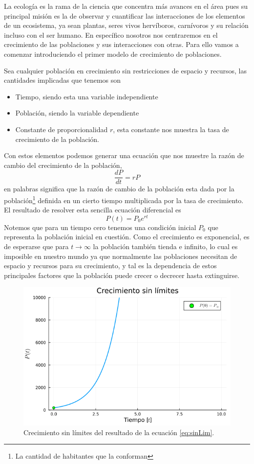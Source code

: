 \documentclass[11pt,a4paper]{article}
\begin{document}
La ecología es la rama de la ciencia que concentra más avances en el área pues su principal misión es la de observar y cuantificar las interacciones de los elementos de un ecosistema, ya sean plantas, seres vivos hervíboros, carnívoros y su relación incluso con el ser humano. En específico nosotros nos centraremos en el crecimiento de las poblaciones y sus interacciones con otras. Para ello vamos a comenzar  introduciendo el primer modelo de crecimiento de poblaciones.

Sea cualquier población en crecimiento sin restricciones de espacio y recursos, las cantidades implicadas que tenemos son
\begin{itemize}
\item Tiempo, siendo esta una variable independiente
\item Población, siendo la variable dependiente
\item Constante de proporcionalidad $r$, esta constante nos muestra la tasa de crecimiento de la población.
\end{itemize}
Con estos elementos podemos generar una ecuación que nos muestre la razón de cambio del crecimiento de la población,
\begin{equation}\label{eq:sinLim}
\frac{dP}{dt}=rP
\end{equation}
en palabras significa que la razón de cambio de la población esta dada por la población\footnote{La cantidad de habitantes que la conforman} definida en un cierto tiempo multiplicada por la tasa de crecimiento. El resultado de resolver esta sencilla ecuación diferencial es
$$P(t)=P_0e^{rt}$$
Notemos que para un tiempo cero tenemos una condición inicial $P_0$ que representa la población inicial en cuestión. Como el crecimiento es exponencial, es de esperarse que para $t\to\infty$ la población también tienda e infinito, lo cual es imposible en nuestro mundo ya que normalmente las poblaciones necesitan de espacio y recursos para su crecimiento, y tal es la dependencia de estos principales factores que la población puede crecer o decrecer hasta extinguirse.
\begin{figure}[h!]
\centering
\includegraphics[scale=.5]{Imagenes/Crecimiento sin limites}
\caption{Crecimiento sin límites del resultado de la ecuación \ref{eq:sinLim}.}
\end{figure}
\end{document}
